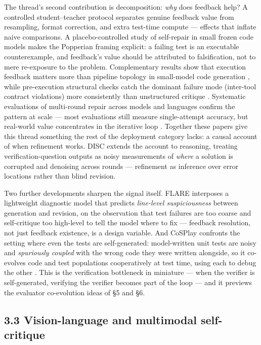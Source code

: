 \documentclass[
  11pt,
]{article}
\begin{document}
The thread's second contribution is decomposition: \emph{why} does
feedback help? A controlled student--teacher protocol
\citep{cupia2026drives} separates genuine feedback value from
resampling, format correction, and extra test-time compute --- effects
that inflate naive comparisons. A placebo-controlled study of
self-repair in small frozen code models \citep{iscan2026falsification}
makes the Popperian framing explicit: a failing test is an executable
counterexample, and feedback's value should be attributed to
falsification, not to mere re-exposure to the problem. Complementary
results show that execution feedback matters more than pipeline topology
in small-model code generation \citep{mcandrews2026feedback}, while
pre-execution structural checks catch the dominant failure mode
(inter-tool contract violations) more consistently than unstructured
critique \citep{levine2026rubricrefine}. Systematic evaluations of
multi-round repair across models and languages confirm the pattern at
scale --- most evaluations still measure single-attempt accuracy, but
real-world value concentrates in the iterative loop
\citep{zhang2026unlocking}. Together these papers give this thread
something the rest of the deployment category lacks: a causal account of
when refinement works. DISC \citep{yin2026denoising} extends the account
to reasoning, treating verification-question outputs as noisy
measurements of \emph{where} a solution is corrupted and denoising
across rounds --- refinement as inference over error locations rather
than blind revision.

Two further developments sharpen the signal itself. FLARE interposes a
lightweight diagnostic model that predicts \emph{line-level
suspiciousness} between generation and revision, on the observation that
test failures are too coarse and self-critique too high-level to tell
the model where to fix \citep{yao2026flare} --- feedback resolution, not
just feedback existence, is a design variable. And CoSPlay confronts the
setting where even the tests are self-generated: model-written unit
tests are noisy and \emph{spuriously coupled} with the wrong code they
were written alongside, so it co-evolves code and test populations
cooperatively at test time, using each to debug the other
\citep{hu2026cosplay}. This is the verification bottleneck in miniature
--- when the verifier is self-generated, verifying the verifier becomes
part of the loop --- and it previews the evaluator co-evolution ideas of
§5 and §6.

\subsection{3.3 Vision-language and multimodal
self-critique}\label{vision-language-and-multimodal-self-critique}
\end{document}
